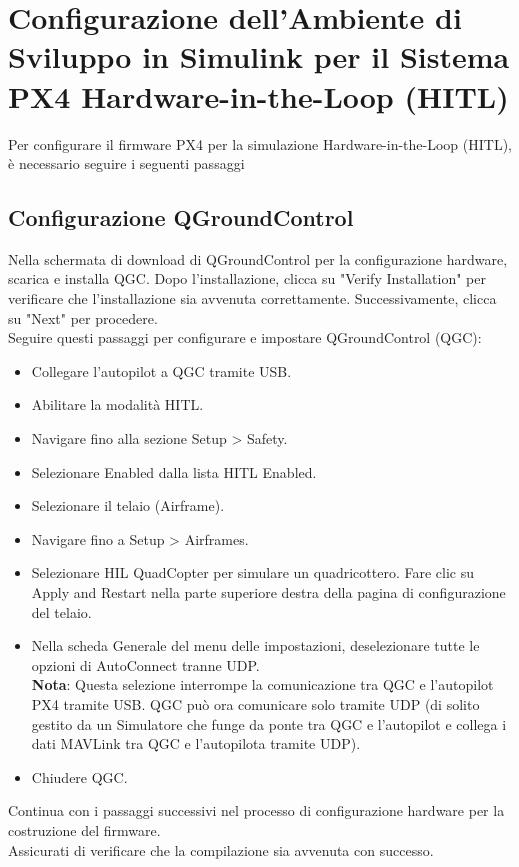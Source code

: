\chapter{Configurazione dell'Ambiente di Sviluppo in Simulink per il Sistema PX4 Hardware-in-the-Loop (HITL)}
Per configurare il firmware PX4 per la simulazione Hardware-in-the-Loop (HITL), è necessario seguire i seguenti passaggi

\section{Configurazione QGroundControl}

Nella schermata di download di QGroundControl per la configurazione hardware, scarica e installa QGC.
Dopo l'installazione, clicca su "Verify Installation" per verificare che l'installazione sia avvenuta correttamente.
Successivamente, clicca su "Next" per procedere.
\\
Seguire questi passaggi per configurare e impostare QGroundControl (QGC):
\begin{itemize}
    \item Collegare l'autopilot a QGC tramite USB.
    \item Abilitare la modalità HITL.
    \item Navigare fino alla sezione Setup > Safety.
    \item Selezionare Enabled dalla lista HITL Enabled.
    \item Selezionare il telaio (Airframe).
    \item Navigare fino a Setup > Airframes.
    \item Selezionare HIL QuadCopter per simulare un quadricottero. Fare clic su Apply and Restart nella parte superiore destra della pagina di configurazione del telaio.
    \item Nella scheda Generale del menu delle impostazioni, deselezionare tutte le opzioni di AutoConnect tranne UDP.
    \\
    \textbf{Nota}: Questa selezione interrompe la comunicazione tra QGC e l'autopilot PX4 tramite USB. QGC può ora comunicare solo tramite UDP (di solito gestito da un Simulatore che funge da ponte tra QGC e l'autopilot e collega i dati MAVLink tra QGC e l'autopilota tramite UDP).
    \\
    \item Chiudere QGC.
\end{itemize}
\noindent

Continua con i passaggi successivi nel processo di configurazione hardware per la costruzione del firmware. 
\\
Assicurati di verificare che la compilazione sia avvenuta con successo.

